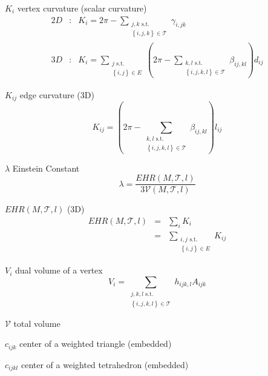 \documentclass{article}
\begin{document}
$K_{i}$ vertex curvature (scalar curvature)%
\begin{eqnarray*}
2D &:&K_{i}=2\pi -\sum_{\substack{ j,k\text{ s.t.} \\ \left\{ i,j,k\right\}
\in \mathcal{T}}}\gamma _{i,jk} \\
3D &:&K_{i}=\sum_{\substack{ j\text{ s.t.} \\ \left\{ i,j\right\} \in E}}%
\left( 2\pi -\sum_{\substack{ k,l\text{ s.t.} \\ \left\{ i,j,k,l\right\} \in 
\mathcal{T}}}\beta _{ij,kl}\right) d_{ij}
\end{eqnarray*}

$K_{ij}$ edge curvature (3D)%
\[
K_{ij}=\left( 2\pi -\sum_{\substack{ k,l\text{ s.t.} \\ \left\{
i,j,k,l\right\} \in \mathcal{T}}}\beta _{ij,kl}\right) l_{ij}
\]

$\lambda $ Einstein Constant%
\[
\lambda =\frac{EHR\left( M,\mathcal{T},l\right) }{3\mathcal{V}\left( M,%
\mathcal{T},l\right) }
\]

$EHR\left( M,\mathcal{T},l\right) $ (3D)%
\begin{eqnarray*}
EHR\left( M,\mathcal{T},l\right)  &=&\sum_{i}K_{i} \\
&=&\sum_{\substack{ i,j\text{ s.t.} \\ \left\{ i,j\right\} \in E}}K_{ij}
\end{eqnarray*}

$V_{i}$ dual volume of a vertex%
\[
V_{i}=\sum_{\substack{ j,k,l\text{ s.t.} \\ \left\{ i,j,k,l\right\} \in 
\mathcal{T}}}h_{ijk,l}A_{ijk}
\]

$\mathcal{V}$ total volume

$c_{ijk}$ center of a weighted triangle (embedded)

$c_{ijkl}$ center of a weighted tetrahedron (embedded)
\end{document}
